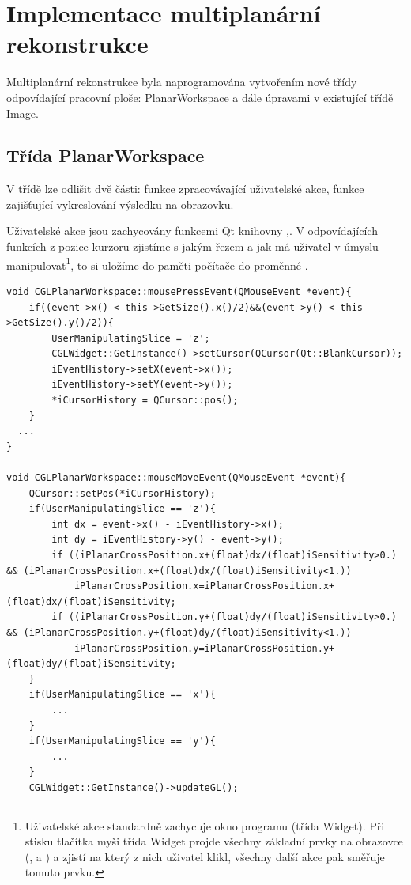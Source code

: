 \section{Implementace multiplanární rekonstrukce}
Multiplanární rekonstrukce byla naprogramována vytvořením nové třídy odpovídající pracovní ploše: PlanarWorkspace a dále úpravami v existující třídě Image.

\subsection{Třída PlanarWorkspace}
V třídě lze odlišit dvě části: funkce zpracovávající uživatelské akce, funkce zajišťující vykreslování výsledku na obrazovku.

Uživatelské akce jsou zachycovány funkcemi Qt knihovny ,. V odpovídajících funkcích z pozice kurzoru zjistíme s jakým řezem a jak má uživatel v úmyslu manipulovat\footnote{Uživatelské akce standardně zachycuje okno programu (třída Widget). Při stisku tlačítka myši třída Widget projde všechny základní prvky na obrazovce (,  a ) a zjistí na který z nich uživatel klikl, všechny další akce pak směřuje tomuto prvku.}, to si uložíme do paměti počítače do proměnné .

\begin{lstlisting}[label=DicomImageClass,caption={První část souboru \texttt{Window.cpp} se zdrojovým kódem třídy reprezentující okno programu.}]
void CGLPlanarWorkspace::mousePressEvent(QMouseEvent *event){
	if((event->x() < this->GetSize().x()/2)&&(event->y() < this->GetSize().y()/2)){
		UserManipulatingSlice = 'z';
		CGLWidget::GetInstance()->setCursor(QCursor(Qt::BlankCursor));
		iEventHistory->setX(event->x());	
		iEventHistory->setY(event->y());
		*iCursorHistory = QCursor::pos();
	}
  ...
}

void CGLPlanarWorkspace::mouseMoveEvent(QMouseEvent *event){
	QCursor::setPos(*iCursorHistory);
	if(UserManipulatingSlice == 'z'){
		int dx = event->x() - iEventHistory->x();
		int dy = iEventHistory->y() - event->y();
		if ((iPlanarCrossPosition.x+(float)dx/(float)iSensitivity>0.) && (iPlanarCrossPosition.x+(float)dx/(float)iSensitivity<1.))
			iPlanarCrossPosition.x=iPlanarCrossPosition.x+(float)dx/(float)iSensitivity;
		if ((iPlanarCrossPosition.y+(float)dy/(float)iSensitivity>0.) && (iPlanarCrossPosition.y+(float)dy/(float)iSensitivity<1.))
			iPlanarCrossPosition.y=iPlanarCrossPosition.y+(float)dy/(float)iSensitivity;
	}
	if(UserManipulatingSlice == 'x'){
 		...
	}
	if(UserManipulatingSlice == 'y'){
 		...
	}
	CGLWidget::GetInstance()->updateGL();
\end{lstlisting}

